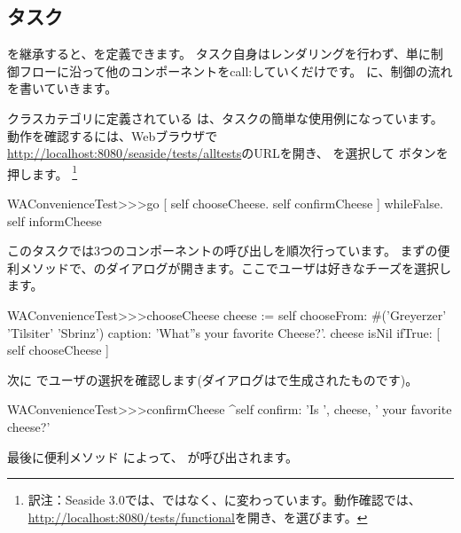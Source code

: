 \documentclass[a4paper,10pt,twoside]{book}
\begin{document}
\subsection{タスク}

を継承すると、を定義できます。
タスク自身はレンダリングを行わず、単に制御フローに沿って他のコンポーネントをcall:していくだけです。 に、制御の流れを書いていきます。

クラスカテゴリに定義されている は、タスクの簡単な使用例になっています。
動作を確認するには、Webブラウザで \url{http://localhost:8080/seaside/tests/alltests}のURLを開き、  を選択して ボタンを押します。
\footnote{訳注：Seaside 3.0では、ではなく、に変わっています。動作確認では、\url{http://localhost:8080/tests/functional}を開き、を選びます。}

\begin{code}{}
WAConvenienceTest>>>go
	[ self chooseCheese.
	  self confirmCheese ] whileFalse.
	self informCheese
\end{code}

このタスクでは3つのコンポーネントの呼び出しを順次行っています。
まずの便利メソッドで、のダイアログが開きます。ここでユーザは好きなチーズを選択します。

\begin{code}{}
WAConvenienceTest>>>chooseCheese
	cheese := self
		chooseFrom: #('Greyerzer' 'Tilsiter' 'Sbrinz')
		caption: 'What''s your favorite Cheese?'.
	cheese isNil ifTrue: [ self chooseCheese ]
\end{code}


次に  でユーザの選択を確認します(ダイアログはで生成されたものです)。

\begin{code}{}
WAConvenienceTest>>>confirmCheese
	^self confirm: 'Is ', cheese,  ' your favorite cheese?'
\end{code}

最後に便利メソッド によって、 が呼び出されます。
\end{document}
